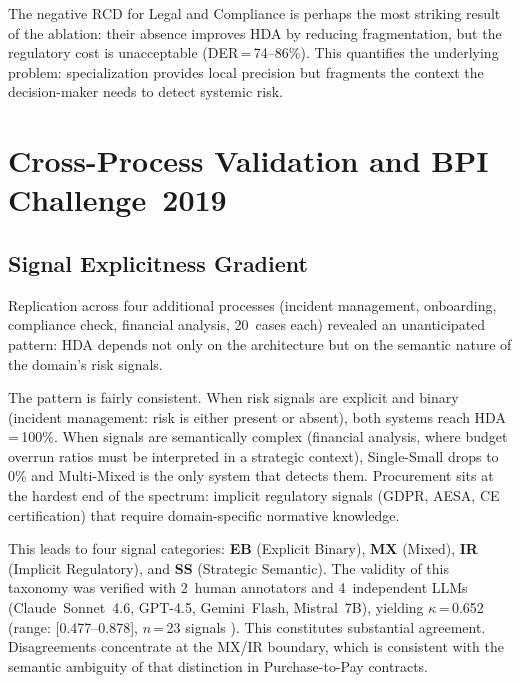 \documentclass[preprint,12pt,numrefs]{elsarticle}
\begin{document}
The negative RCD for Legal and Compliance is perhaps the most striking
result of the ablation: their absence improves HDA by reducing
fragmentation, but the regulatory cost is unacceptable
(DER\,=\,74--86\%). This quantifies the underlying problem:
specialization provides local precision but fragments the context the
decision-maker needs to detect systemic risk.

\section{Cross-Process Validation and BPI Challenge~2019}
\label{sec:crossprocess}

\subsection{Signal Explicitness Gradient}

Replication across four additional processes (incident management,
onboarding, compliance check, financial analysis, 20~cases each)
revealed an unanticipated pattern: HDA depends not only on the
architecture but on the semantic nature of the domain's risk signals.

The pattern is fairly consistent. When risk signals are explicit and
binary (incident management: risk is either present or absent), both
systems reach HDA\,=\,100\%. When signals are semantically complex
(financial analysis, where budget overrun ratios must be interpreted
in a strategic context), Single-Small drops to 0\% and Multi-Mixed is
the only system that detects them. Procurement sits at the hardest end
of the spectrum: implicit regulatory signals (GDPR, AESA, CE
certification) that require domain-specific normative knowledge.

This leads to four signal categories: \textbf{EB} (Explicit Binary),
\textbf{MX} (Mixed), \textbf{IR} (Implicit Regulatory), and \textbf{SS}
(Strategic Semantic). The validity of this taxonomy was verified with
2~human annotators and 4~independent LLMs (Claude~Sonnet~4.6, GPT-4.5,
Gemini~Flash, Mistral~7B), yielding $\kappa$\,=\,0.652 (range:
[0.477--0.878], $n$\,=\,23 signals
\citep{Cohen1960kappa,LandisKoch1977kappa}). This constitutes
substantial agreement. Disagreements concentrate at the MX/IR boundary,
which is consistent with the semantic ambiguity of that distinction in
Purchase-to-Pay contracts.
\end{document}
